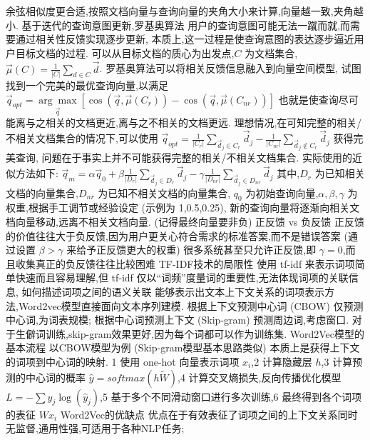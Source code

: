 \documentclass[10pt, utf8]{ctexart}
\begin{document}
\begin{multicols}{4}
    余弦相似度更合适,按照文档向量与查询向量的夹角大小来计算,向量越一致,夹角越小.
    {\color{red}基于迭代的查询意图更新,罗基奥算法}
    用户的查询意图可能无法一蹴而就,而需要通过相关性反馈实现逐步更新,
    本质上,这一过程是使查询意图的表达逐步逼近用户目标文档的过程.
    可以从目标文档的质心为出发点,$C$ 为文档集合,$\vec\mu(C)=\frac{1}{|C|}\sum_{d\in C}\vec d$.
    罗基奥算法可以将相关反馈信息融入到向量空间模型,
    试图找到一个完美的最优查询向量,以满足
    $\vec{q}_{opt}=\underset{\vec{q}}{\arg\max}\left[\cos \left(\vec{q}, \vec{\mu}\left(C_{r}\right)\right)-\cos \left(\vec{q}, \vec{\mu}\left(C_{n r}\right)\right)\right]$
    也就是使查询尽可能离与之相关的文档更近,离与之不相关的文档更远.
    理想情况,在可知完整的相关/不相关文档集合的情况下,可以使用
    $\vec{q}_{opt}=\frac{1}{\left|C_{r}\right|} \sum_{\vec{d}_{j} \in C_{r}} \vec{d}_{j}-\frac{1}{\left|C_{n r}\right|} \sum_{\vec{d}_{j} \notin  C_{r}} \vec{d}_{j}$ 获得完美查询,
    问题在于事实上并不可能获得完整的相关/不相关文档集合.
    实际使用的近似方法如下:
    {\tiny$\vec{q}_{m}=\alpha \vec{q}_{0}+ \beta  \frac{1}{\left|D_{r}\right|} \sum_{\vec{d}_{j} \in D_{r}} \vec{d}_{j}-\gamma \frac{1}{\left|D_{n r}\right|} \sum_{\vec{d}_{j} \in  D_{nr}} \vec{d}_{j}$}
    其中,$D_r$ 为已知相关文档的向量集合,$D_{nr}$ 为已知不相关文档的向量集合,
    $q_0$ 为初始查询向量,$\alpha,\beta,\gamma$ 为权重,根据手工调节或经验设定 (示例为 1,0.5,0.25),
    新的查询向量将逐渐向相关文档向量移动,远离不相关文档向量. (记得最终向量要非负)
    {\color{blue}正反馈 vs 负反馈}
    正反馈的价值往往大于负反馈,因为用户更关心符合需求的标准答案,而不是错误答案 (通过设置 $\beta > \gamma $ 来给予正反馈更大的权重)
    很多系统甚至只允许正反馈,即 $\gamma = 0$,而且收集真正的负反馈往往比较困难
    {\color{blue}TF-IDF技术的局限性}
    使用 tf-idf 来表示词项简单快速而且容易理解,但 tf-idf 仅以“词频”度量词的重要性,无法体现词项的关联信息,
    {\color{blue}如何描述词项之间的语义关联}
    能够表示出文本上下文关系的词项表示方法,Word2vec模型直接面向文本序列建模.
    根据上下文预测中心词 (CBOW) 仅预测中心词,为词表规模;
    根据中心词预测上下文 (Skip-gram) 预测周边词,考虑窗口.
    对于生僻词训练,skip-gram效果更好,因为每个词都可以作为训练集.
    {\color{blue}Word2Vec模型的基本流程}
    以CBOW模型为例 (Skip-gram模型基本思路类似)
    本质上是获得上下文的词项到中心词的映射.
    1 使用 one-hot 向量表示词项 $x_i$,2 计算隐藏层 $h$,3 计算预测的中心词的概率 $\hat{y}=softmax(h\tilde{W})$,4 计算交叉熵损失,反向传播优化模型 $L=-\sum y_j\log(\hat y_j)$,5 基于多个不同滑动窗口进行多次训练,6 最终得到各个词项的表征 $Wx_i$
    {\color{blue}Word2Vec的优缺点}
    优点在于有效表征了词项之间的上下文关系同时无监督,通用性强,可适用于各种NLP任务;

\end{multicols}
\end{document}
